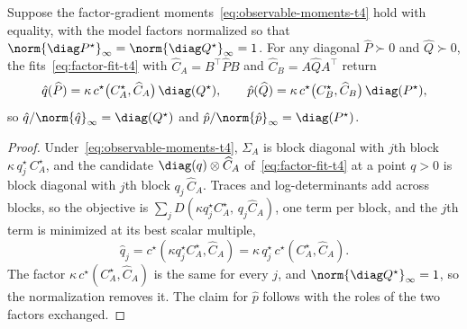 \begin{lemma}[Consistency]\label{lem:consistency-t4}
Suppose the factor-gradient moments~\eqref{eq:observable-moments-t4} hold with
equality, with the model factors normalized so that
$\norm{\diag P^\star}_\infty=\norm{\diag Q^\star}_\infty=1$. For any diagonal
$\widehat P\succ0$ and $\widehat Q\succ0$, the
fits~\eqref{eq:factor-fit-t4} with $\widehat C_A=B^\top\widehat PB$ and
$\widehat C_B=A\widehat QA^\top$ return
\[
  \hat{q}(\widehat P)=\kappa\,c^\star\big(C^\star_A,\widehat C_A\big)\,\diag(Q^\star),
  \qquad
  \hat{p}(\widehat Q)=\kappa\,c^\star\big(C^\star_B,\widehat C_B\big)\,\diag(P^\star),
\]
so $\hat{q}/\norm{\hat{q}}_\infty=\diag(Q^\star)$ and
$\hat{p}/\norm{\hat{p}}_\infty=\diag(P^\star)$.
\end{lemma}
\begin{proof}
Under~\eqref{eq:observable-moments-t4}, $\Sigma_A$ is
block diagonal with $j$th block $\kappa\,q^\star_j\,C^\star_A$, and the
candidate $\diag(q)\otimes\widehat C_A$ of~\eqref{eq:factor-fit-t4} at a
point $q>0$ is block diagonal with $j$th block $q_j\,\widehat C_A$. Traces
and log-determinants add across blocks, so the objective is
$\sum_jD(\kappa q^\star_jC^\star_A,\,q_j\widehat C_A)$, one term per block,
and the $j$th term is minimized at its best scalar multiple,
\[
\hat{q}_j=c^\star(\kappa q^\star_jC^\star_A,\widehat C_A)
=\kappa\,q^\star_j\,c^\star(C^\star_A,\widehat C_A).
\]
The factor $\kappa\,c^\star(C^\star_A,\widehat C_A)$ is the same for every
$j$, and $\norm{\diag Q^\star}_\infty=1$, so the normalization removes it.
The claim for $\hat{p}$ follows with the roles of the two factors exchanged.
\end{proof}

